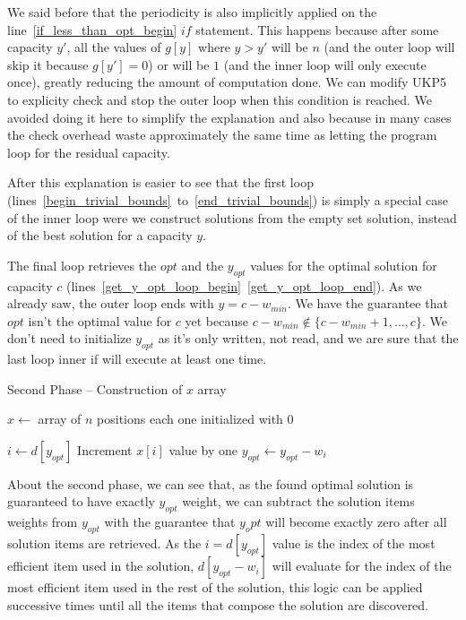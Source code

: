 \documentclass[12pt]{article}
\begin{document}
We said before that the periodicity is also implicitly applied on the line~\ref{if_less_than_opt_begin} \(if\) statement. This happens because after some capacity \(y'\), all the values of \(g[y]\) where \(y > y'\) will be \(n\) (and the outer loop will skip it because \(g[y'] = 0\)) or will be \(1\) (and the inner loop will only execute once), greatly reducing the amount of computation done. We can modify UKP5 to explicity check and stop the outer loop when this condition is reached. We avoided doing it here to simplify the explanation and also because in many cases the check overhead waste approximately the same time as letting the program loop for the residual capacity.

After this explanation is easier to see that the first loop (lines~\ref{begin_trivial_bounds}~to~\ref{end_trivial_bounds}) is simply a special case of the inner loop were we construct solutions from the empty set solution, instead of the best solution for a capacity \(y\).

The final loop retrieves the \(opt\) and the \(y_{opt}\) values for the optimal solution for capacity \(c\) (lines~\ref{get_y_opt_loop_begin}~\ref{get_y_opt_loop_end}). As we already saw, the outer loop ends with \(y = c-w_{min}\). We have the guarantee that \(opt\) isn't the optimal value for \(c\) yet because \(c-w_{min} \not\in \{c-w_{min}+1, \ldots, c\}\). We don't need to initialize \(y_{opt}\) as it's only written, not read, and we are sure that the last loop inner if will execute at least one time.

\begin{algorithm}
\caption{Second Phase -- Construction of \(x\) array}\label{alg:ukp5_second_phase}
\begin{algorithmic}[1]
  \State \(x \gets\) array of \(n\) positions each one initialized with \(0\)\label{create_x}
  
    \State \(i \gets d[y_{opt}]\)
    \State Increment \(x[i]\) value by one
    \State \(y_{opt} \gets y_{opt} - w_i\)
  \EndWhile
\EndProcedure
\end{algorithmic}
\end{algorithm}

About the second phase, we can see that, as the found optimal solution is guaranteed to have exactly \(y_{opt}\) weight, we can subtract the solution items weights from \(y_{opt}\) with the guarantee that \(y_opt\) will become exactly zero after all solution items are retrieved. As the \(i = d[y_{opt}]\) value is the index of the most efficient item used in the solution, \(d[y_{opt} - w_i]\) will evaluate for the index of the most efficient item used in the rest of the solution, this logic can be applied successive times until all the items that compose the solution are discovered.
\end{document}
